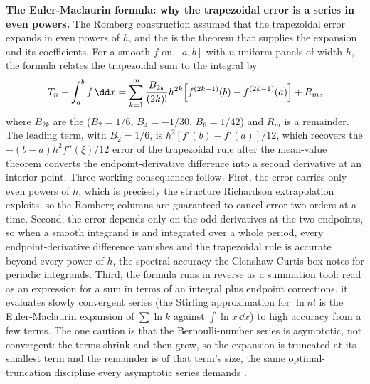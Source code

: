 \begin{mastery}
\textbf{The Euler-Maclaurin formula: why the trapezoidal error is a
series in even powers.} The Romberg construction assumed that the
trapezoidal error expands in even powers of $h$, and the
 is the theorem that supplies the
expansion and its coefficients. For a smooth $f$ on $[a, b]$ with $n$
uniform panels of width $h$, the formula relates the trapezoidal sum to
the integral by
\[
T_{n} - \int_{a}^{b} f\,\dd x = \sum_{k=1}^{m}\frac{B_{2k}}{(2k)!}
h^{2k}\Bigl[f^{(2k-1)}(b) - f^{(2k-1)}(a)\Bigr] + R_{m},
\]
where $B_{2k}$ are the  ($B_{2} = 1/6$,
$B_{4} = -1/30$, $B_{6} = 1/42$) and $R_{m}$ is a remainder. The leading
term, with $B_{2} = 1/6$, is $h^{2}[f'(b) - f'(a)]/12$, which recovers
the $-(b-a)h^{2}f''(\xi)/12$ error of the trapezoidal rule after the
mean-value theorem converts the endpoint-derivative difference into a
second derivative at an interior point. Three working consequences
follow. First, the error carries only even powers of $h$, which is
precisely the structure Richardson extrapolation exploits, so the
Romberg columns are guaranteed to cancel error two orders at a time.
Second, the error depends only on the odd derivatives at the two
endpoints, so when a smooth integrand is  and
integrated over a whole period, every endpoint-derivative difference
vanishes and the trapezoidal rule is accurate beyond every power of $h$,
the spectral accuracy the Clenshaw-Curtis box notes for periodic
integrands. Third, the formula runs in reverse as a summation tool: read
as an expression for a sum in terms of an integral plus endpoint
corrections, it evaluates slowly convergent series (the Stirling
approximation for $\ln n!$ is the Euler-Maclaurin expansion of
$\sum\ln k$ against $\int\ln x\,\dd x$) to high accuracy from a few
terms. The one caution is that the Bernoulli-number series is asymptotic,
not convergent: the terms shrink and then grow, so the expansion is
truncated at its smallest term and the remainder is of that term's size,
the same optimal-truncation discipline every asymptotic series demands
\cite{text:v2ch06-burden-faires-numerical}.
\end{mastery}

